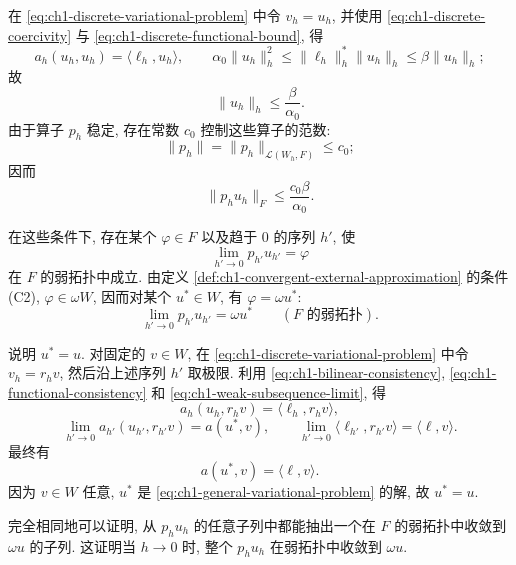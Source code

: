 \begin{Proof}
在 \eqref{eq:ch1-discrete-variational-problem} 中令 $v_h=u_h$, 并使用 \eqref{eq:ch1-discrete-coercivity} 与 \eqref{eq:ch1-discrete-functional-bound}, 得
\begin{equation}
a_h(u_h,u_h)=\langle\ell_h,u_h\rangle,\qquad
\alpha_0\|u_h\|_h^2\leq\|\ell_h\|_h^\ast\|u_h\|_h\leq\beta\|u_h\|_h;
\label{eq:ch1-discrete-energy-identity}
\end{equation}
故
\begin{equation}
\|u_h\|_h\leq\frac{\beta}{\alpha_0}.
\label{eq:ch1-discrete-solution-bound}
\end{equation}
由于算子 $p_h$ 稳定, 存在常数 $c_0$ 控制这些算子的范数:
\begin{equation}
\|p_h\|=\|p_h\|_{\mathcal L(W_h,F)}\leq c_0;
\label{eq:ch1-prolongation-uniform-bound}
\end{equation}
因而
\begin{equation}
\|p_hu_h\|_F\leq\frac{c_0\beta}{\alpha_0}.
\label{eq:ch1-prolongated-solution-bound}
\end{equation}

在这些条件下, 存在某个 $\varphi\in F$ 以及趋于 $0$ 的序列 $h'$, 使
\[
\lim_{h'\to0}p_{h'}u_{h'}=\varphi
\]
在 $F$ 的弱拓扑中成立. 由定义 \ref{def:ch1-convergent-external-approximation} 的条件 (C2), $\varphi\in\omega W$, 因而对某个 $u^\ast\in W$, 有 $\varphi=\omega u^\ast$:
\begin{equation}
\lim_{h'\to0}p_{h'}u_{h'}=\omega u^\ast
\qquad(F\text{ 的弱拓扑}).
\label{eq:ch1-weak-subsequence-limit}
\end{equation}

说明 $u^\ast=u$. 对固定的 $v\in W$, 在 \eqref{eq:ch1-discrete-variational-problem} 中令 $v_h=r_hv$, 然后沿上述序列 $h'$ 取极限. 利用 \eqref{eq:ch1-bilinear-consistency}, \eqref{eq:ch1-functional-consistency} 和 \eqref{eq:ch1-weak-subsequence-limit}, 得
\[
a_h(u_h,r_hv)=\langle\ell_h,r_hv\rangle,
\]
\[
\lim_{h'\to0}a_{h'}(u_{h'},r_{h'}v)=a(u^\ast,v),
\qquad
\lim_{h'\to0}\langle\ell_{h'},r_{h'}v\rangle=\langle\ell,v\rangle.
\]
最终有
\[
a(u^\ast,v)=\langle\ell,v\rangle.
\]
因为 $v\in W$ 任意, $u^\ast$ 是 \eqref{eq:ch1-general-variational-problem} 的解, 故 $u^\ast=u$.

完全相同地可以证明, 从 $p_hu_h$ 的任意子列中都能抽出一个在 $F$ 的弱拓扑中收敛到 $\omega u$ 的子列. 这证明当 $h\to0$ 时, 整个 $p_hu_h$ 在弱拓扑中收敛到 $\omega u$.


\end{Proof}
